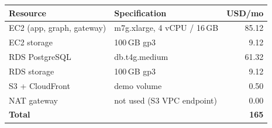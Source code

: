 \begin{tabular}{@{}llr@{}}
\toprule
\textbf{Resource} & \textbf{Specification} & \textbf{USD/mo} \\
\midrule
EC2 (app, graph, gateway) & m7g.xlarge, 4 vCPU / 16\,GB & 85.12 \\
EC2 storage               & 100\,GB gp3                 & 9.12 \\
RDS PostgreSQL            & db.t4g.medium               & 61.32 \\
RDS storage               & 100\,GB gp3                 & 9.12 \\
S3 + CloudFront           & demo volume                 & 0.50 \\
NAT gateway               & not used (S3 VPC endpoint)  & 0.00 \\
\midrule
\textbf{Total}            &                             & \textbf{165} \\
\bottomrule
\end{tabular}
